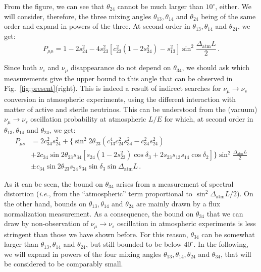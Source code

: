 \documentclass[12pt]{elsart}
\newcommand{\Atm}{\text{atm}}
\begin{document}
From the figure, we can see that $\theta_{24}$ cannot be much larger
than $10^\circ$, either. We will consider, therefore, the three mixing
angles $\theta_{13}, \theta_{14}$ and $\theta_{24}$ being of the same
order and expand in powers of the three.  At second order in
$\theta_{13}, \theta_{14}$ and $\theta_{24}$, we get:
%
\begin{equation}
    \label{eq:pmumu}
    P_{\mu\mu} = 1 - 2 s^2_{24}
    - 4 s^2_{23} \left[ c^2_{23} (1 - 2 s^2_{24}) - s^2_{13} \right]
    \sin^2 \frac{\Delta_\Atm L }{2} \,.
\end{equation}

Since both $\nu_e$ and $\nu_\mu$ disappearance do not depend on
$\theta_{34}$, we should ask which measurements give the upper bound
to this angle that can be observed in Fig.~\ref{fig:present}(right). 
This is indeed a result of indirect searches for $\nu_\mu \to \nu_s$
conversion in atmospheric experiments, using the different interaction
with matter of active and sterile neutrinos. This can be understood
from the (vacuum) $\nu_\mu \to \nu_s$ oscillation probability at
atmospheric $L/E$ for which, at second order in $\theta_{13},
\theta_{14}$ and $\theta_{24}$, we get:
%
\begin{equation} \begin{split}
    \label{eq:pmus}
    P_{\mu s} &= 2 c^2_{34} s^2_{24} + \big\lbrace
    \sin^2 2 \theta_{23} (c^4_{13} c^2_{24} s^2_{34}
    - c^2_{34} s^2_{24})
    \\
    &+ 2  c_{34} \sin 2 \theta_{23} s_{34} \left[
    s_{24} (1 -2 s^2_{23}) \cos \delta_3
    + 2 s_{23} s_{13} s_{14} \cos \delta_2 \right] \big\rbrace
    \sin^2 \frac{\Delta_\Atm L }{2}
    \\
    &\pm c_{34} \sin 2 \theta_{23} s_{24} s_{34}
    \sin\delta_3 \sin\Delta_\Atm L \,.
\end{split} \end{equation}

As it can be seen, the bound on $\theta_{34}$ arises from a
measurement of spectral distortion (\textit{i.e.}, from the
``atmospheric'' term proportional to $\sin^2 \Delta_\Atm L/2$). On the
other hand, bounds on $\theta_{13},\theta_{14}$ and $\theta_{24}$ are
mainly drawn by a flux normalization measurement. As a consequence,
the bound on $\theta_{34}$ that we can draw by non-observation of
$\nu_\mu \to \nu_s$ oscillation in atmospheric experiments is less
stringent than those we have shown before.  For this reason,
$\theta_{34}$ can be somewhat larger than $\theta_{13},\theta_{14}$
and $\theta_{24}$, but still bounded to be below $40^\circ$.  In the
following, we will expand in powers of the four mixing angles
$\theta_{13},\theta_{14}, \theta_{24}$ and $\theta_{34}$, that will be
considered to be comparably small. 
\end{document}
